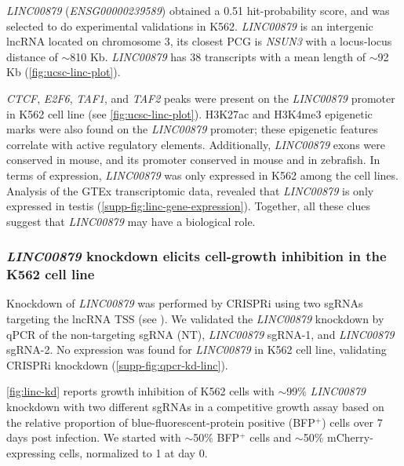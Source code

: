 \textit{LINC00879} (\textit{ENSG00000239589}) obtained a 0.51 hit-probability score, and was selected to do experimental validations in K562. \textit{LINC00879} is an intergenic lncRNA located on chromosome 3, its closest PCG is \textit{NSUN3} with a locus-locus distance of $\sim$810 Kb. \textit{LINC00879} has 38 transcripts with a mean length of $\sim$92 Kb (\autoref{fig:ucsc-linc-plot}).

\textit{CTCF}, \textit{E2F6}, \textit{TAF1}, and \textit{TAF2} peaks were present on the \textit{LINC00879} promoter in K562 cell line (see \autoref{fig:ucsc-linc-plot}). H3K27ac and H3K4me3 epigenetic marks were also found on the \textit{LINC00879} promoter; these epigenetic features correlate with active regulatory elements.\autocite{ernst_2011,bernstein_2005} Additionally, \textit{LINC00879} exons were conserved in mouse, and its promoter conserved in mouse and in zebrafish. In terms of expression, \textit{LINC00879} was only expressed in K562 among the cell lines. Analysis of the GTEx\autocite{gtex_2013} transcriptomic data, revealed that \textit{LINC00879} is only expressed in testis (\autoref{supp-fig:linc-gene-expression}). Together, all these clues suggest that \textit{LINC00879} may have a biological role.

\subsubsection{\textit{LINC00879} knockdown elicits cell-growth inhibition in the K562 cell line}
\label{sub-sec:linc-kd}

Knockdown of \textit{LINC00879} was performed by CRISPRi using two sgRNAs targeting the lncRNA TSS (see ). We validated the \textit{LINC00879} knockdown by qPCR of the non-targeting sgRNA (NT), \textit{LINC00879} sgRNA-1, and \textit{LINC00879} sgRNA-2. No expression was found for \textit{LINC00879} in K562 cell line, validating CRISPRi knockdown (\autoref{supp-fig:qpcr-kd-linc}).

\autoref{fig:linc-kd} reports growth inhibition of K562 cells with $\sim$99\% \textit{LINC00879} knockdown with two different sgRNAs in a competitive growth assay based on the relative proportion of blue-fluorescent-protein positive (BFP$^+$) cells over 7 days post infection. We started with $\sim$50\% BFP$^+$ cells and $\sim$50\% mCherry-expressing cells, normalized to 1 at day 0.

